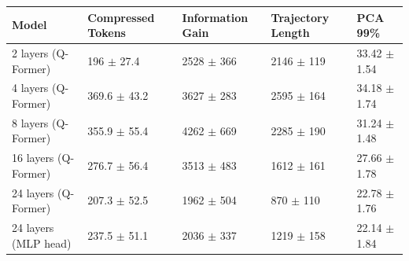 \begin{tabular}{lllll}
\toprule
 Model                & Compressed Tokens         & Information Gain        & Trajectory Length       & PCA 99\%                   \\
\midrule
 2 layers (Q-Former)  & 196 {\small $\pm$ 27.4}   & 2528 {\small $\pm$ 366} & 2146 {\small $\pm$ 119} & 33.42 {\small $\pm$ 1.54} \\
 4 layers (Q-Former)  & 369.6 {\small $\pm$ 43.2} & 3627 {\small $\pm$ 283} & 2595 {\small $\pm$ 164} & 34.18 {\small $\pm$ 1.74} \\
 8 layers (Q-Former)  & 355.9 {\small $\pm$ 55.4} & 4262 {\small $\pm$ 669} & 2285 {\small $\pm$ 190} & 31.24 {\small $\pm$ 1.48} \\
 16 layers (Q-Former) & 276.7 {\small $\pm$ 56.4} & 3513 {\small $\pm$ 483} & 1612 {\small $\pm$ 161} & 27.66 {\small $\pm$ 1.78} \\
 \midrule
 24 layers (Q-Former) & 207.3 {\small $\pm$ 52.5} & 1962 {\small $\pm$ 504} & 870 {\small $\pm$ 110}  & 22.78 {\small $\pm$ 1.76} \\
 24 layers (MLP head) & 237.5 {\small $\pm$ 51.1} & 2036 {\small $\pm$ 337} & 1219 {\small $\pm$ 158} & 22.14 {\small $\pm$ 1.84} \\
\bottomrule
\end{tabular}
